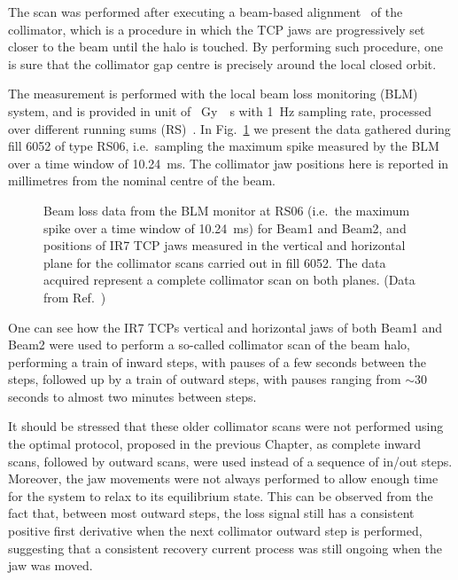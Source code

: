The scan was performed after executing a beam-based alignment~\cite{valentino2012semiautomatic} of the collimator, which is a procedure in which the TCP jaws are progressively set closer to the beam until the halo is touched. By performing such procedure, one is sure that the collimator gap centre is precisely around the local closed orbit.

The measurement is performed with the local beam loss monitoring (BLM) system, and is provided in unit of \SI{}{Gy \per s} with \SI{1}{Hz} sampling rate, processed over different running sums (RS)~\cite{Bruning:782076}. In Fig.~\ref{fig:raw_data} we present the data gathered during fill 6052 of type RS06, i.e.\ sampling the maximum spike measured by the BLM over a time window of \SI{10.24}{ms}. The collimator jaw positions here is reported in millimetres from the nominal centre of the beam.

\begin{figure}[htp]
    \centering
    \caption{Beam loss data from the BLM monitor at RS06 (i.e.\ the maximum spike over a time window of \SI{10.24}{ms}) for Beam1 and Beam2, and positions of IR7 TCP jaws measured in the vertical and horizontal plane for the collimator scans carried out in fill 6052. The data acquired represent a complete collimator scan on both planes. (Data from Ref.~\cite{PhysRevAccelBeams.23.044802})}
    \label{fig:raw_data}
\end{figure}

One can see how the IR7 TCPs vertical and horizontal jaws of both Beam1 and Beam2 were used to perform a so-called collimator scan of the beam halo, performing a train of inward steps, with pauses of a few seconds between the steps, followed up by a train of outward steps, with pauses ranging from $\sim30$ seconds to almost two minutes between steps.

It should be stressed that these older collimator scans were not performed using the optimal protocol, proposed in the previous Chapter, as complete inward scans, followed by outward scans, were used instead of a sequence of in/out steps. Moreover, the jaw movements were not always performed to allow enough time for the system to relax to its equilibrium state. This can be observed from the fact that, between most outward steps, the loss signal still has a consistent positive first derivative when the next collimator outward step is performed, suggesting that a consistent recovery current process was still ongoing when the jaw was moved.

